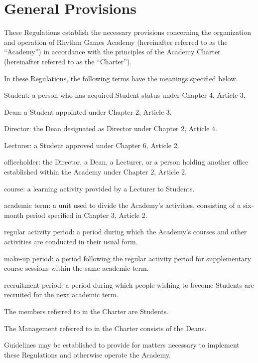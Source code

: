 \newpage
\chapter{General Provisions}
\begin{articles}
  \item These Regulations establish the necessary provisions concerning the organization and operation of Rhythm Games Academy (hereinafter referred to as the ``Academy'') in accordance with the principles of the Academy Charter (hereinafter referred to as the ``Charter'').
  \item In these Regulations, the following terms have the meanings specified below.
  \begin{subitems}
    \item Student: a person who has acquired Student status under Chapter 4, Article 3.
    \item Dean: a Student appointed under Chapter 2, Article 3.
    \item Director: the Dean designated as Director under Chapter 2, Article 4.
    \item Lecturer: a Student approved under Chapter 6, Article 2.
    \item officeholder: the Director, a Dean, a Lecturer, or a person holding another office established within the Academy under Chapter 2, Article 2.
    \item course: a learning activity provided by a Lecturer to Students.
    \item academic term: a unit used to divide the Academy's activities, consisting of a six-month period specified in Chapter 3, Article 2.
    \item regular activity period: a period during which the Academy's courses and other activities are conducted in their usual form.
    \item make-up period: a period following the regular activity period for supplementary course sessions within the same academic term.
    \item recruitment period: a period during which people wishing to become Students are recruited for the next academic term.
  \end{subitems}
  \item The members referred to in the Charter are Students.
  \item The Management referred to in the Charter consists of the Deans.
  \item Guidelines may be established to provide for matters necessary to implement these Regulations and otherwise operate the Academy.

\end{articles}
